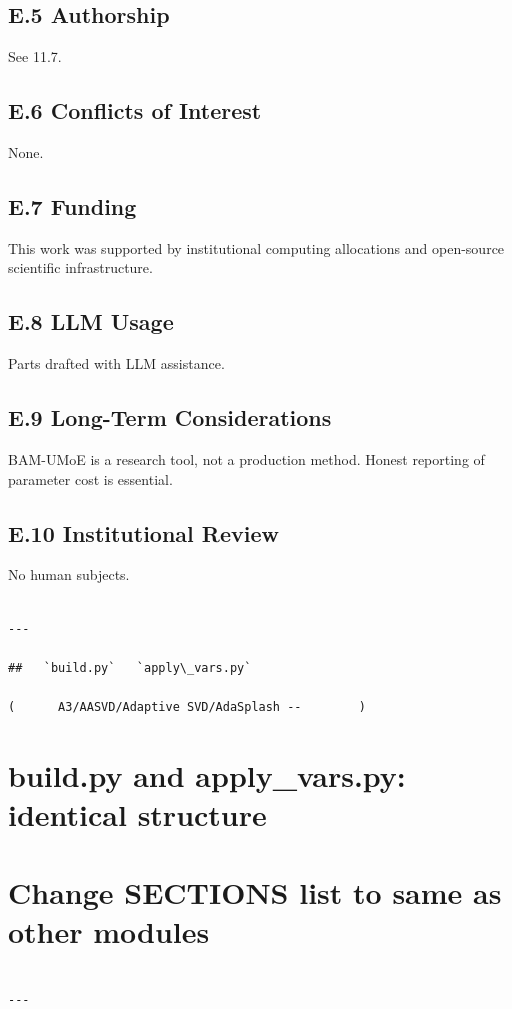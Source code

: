 \subsection{E.5 Authorship}

See  11.7.

\subsection{E.6 Conflicts of Interest}

None.

\subsection{E.7 Funding}

This work was supported by institutional computing allocations and open-source scientific infrastructure.

\subsection{E.8 LLM Usage}

Parts drafted with LLM assistance.

\subsection{E.9 Long-Term Considerations}

BAM-UMoE is a research tool, not a production method. Honest reporting 
of parameter cost is essential.

\subsection{E.10 Institutional Review}

No human subjects.
\begin{lstlisting}

---

##   `build.py`   `apply\_vars.py`

(      A3/AASVD/Adaptive SVD/AdaSplash --        )

\end{lstlisting}
\section{build.py and apply\_vars.py: identical structure}
\section{Change SECTIONS list to same as other modules}
\begin{lstlisting}

---
\end{lstlisting}

